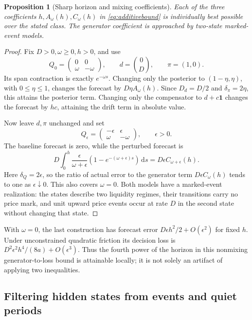 \documentclass[11pt]{article}
\theoremstyle{plain}
\newtheorem{proposition}[theorem]{Proposition}
\theoremstyle{definition}
\theoremstyle{remark}
\newcommand{\dd}{\,\mathrm d}
\begin{document}
\begin{proposition}[Sharp horizon and mixing coefficients]
\label{prop:sharpbookconstants}
Each of the three coefficients \(h,A_\omega(h),C_\omega(h)\)
in \eqref{eq:additivebound} is individually best possible over
the stated class. The generator coefficient is approached by
two-state marked-event models.
\end{proposition}
\begin{proof}
Fix \(D>0,\omega\ge0,h>0\), and use
\[
 Q_0=\begin{pmatrix}0&0\\ \omega&-\omega\end{pmatrix},
 \qquad d=\binom0D,\qquad \pi=(1,0).
\]
Its span contraction is exactly \(e^{-\omega s}\).
Changing only the posterior to \((1-\eta,\eta)\), with
\(0\le\eta\le1\), changes the forecast by
\(D\eta A_\omega(h)\). Since \(D_d=D/2\) and
\(\delta_\pi=2\eta\), this attains the posterior term.
Changing only the compensator to \(d+c\mathbf1\) changes the
forecast by \(hc\), attaining the drift term in absolute value.

Now leave \(d,\pi\) unchanged and set
\[
 Q_\epsilon=
 \begin{pmatrix}-\epsilon&\epsilon\\
                  \omega&-\omega\end{pmatrix},\qquad \epsilon>0.
\]
The baseline forecast is zero, while the perturbed forecast is
\[
 D\int_0^h\frac{\epsilon}{\omega+\epsilon}
                      (1-e^{-(\omega+\epsilon)s})\dd s
 =D\epsilon C_{\omega+\epsilon}(h).
\]
Here \(\delta_Q=2\epsilon\), so the ratio of actual error to
the generator term \(D\epsilon C_\omega(h)\) tends to one as
\(\epsilon\downarrow0\). This also covers \(\omega=0\).
Both models have a marked-event realization: the states describe
two liquidity regimes, their transitions carry no price mark,
and unit upward price events occur at rate \(D\) in the second
state without changing that state.
\end{proof}

With \(\omega=0\), the last construction has forecast error
\(D\epsilon h^2/2+O(\epsilon^2)\) for fixed \(h\).
Under unconstrained quadratic friction its decision loss is
\(D^2\epsilon^2h^4/(8a)+O(\epsilon^3)\).
Thus the fourth power of the horizon in this nonmixing
generator-to-loss bound is attainable locally; it is not solely
an artifact of applying two inequalities.


\subsection{Filtering hidden states from events and quiet periods}
\end{document}
